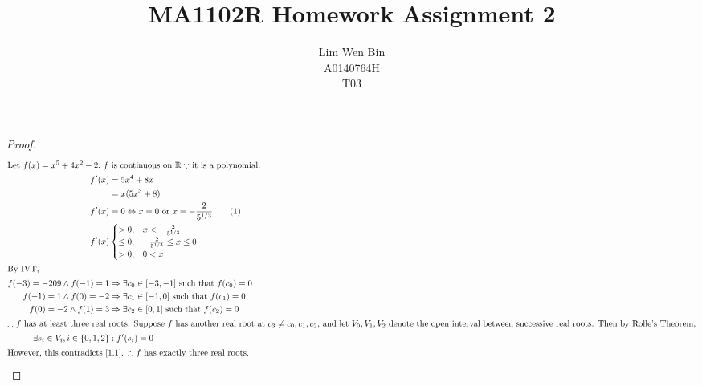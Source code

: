 \documentclass[12pt]{article}
\newenvironment{problem}[2][Problem]{\begin{trivlist}
\item[\hskip \labelsep {\bfseries #1}\hskip \labelsep {\bfseries #2.}]}{\end{trivlist}}
\begin{document}
\title{MA1102R Homework Assignment 2}
\author{Lim Wen Bin \\
A0140764H\\
T03}
\maketitle

\begin{problem}{1}
\end{problem}
\begin{proof}
\begin{align*}
\intertext{Let $f(x) = x^5 + 4x^2 - 2$, $f$ is continuous on $\mathbb{R} \because$ it is a polynomial.}
f'(x) &= 5x^4 + 8x\\
&= x(5x^3 + 8)\\
f'(x) &= 0 \Leftrightarrow x = 0 \text{ or } x = -\frac{2}{5^{1/3}} \tag{1}\label{1.1}\\
f'(x) &\begin{cases}
	> 0, & x < -\frac{2}{5^{1/3}}\\
	\le 0, & -\frac{2}{5^{1/3}} \le x \le 0\\
	> 0, & 0 < x
\end{cases}\\
\intertext{By IVT,}
f(-3) = -209 \land f(-1) = 1 &\Rightarrow \exists c_0 \in [-3,-1] \text{ such that } f(c_0) = 0\\
f(-1) = 1 \land f(0) = -2 &\Rightarrow \exists c_1 \in [-1,0] \text{ such that } f(c_1) = 0\\
f(0) = -2 \land f(1) = 3 &\Rightarrow \exists c_2 \in [0,1] \text{ such that } f(c_2) = 0\\
\intertext{$\therefore$ $f$ has at least three real roots. Suppose $f$ has another real root at $c_3 \ne c_0, c_1, c_2$, and let $V_0, V_1, V_2$ denote the open interval between successive real roots. Then by Rolle's Theorem,}
\exists s_i \in V_i, i \in \{0, 1, 2\} &: f'(s_i)= 0\\
\intertext{However, this contradicts \eqref{1.1}. $\therefore$ $f$ has exactly three real roots.}
\end{align*}
\end{proof}
\filbreak
\end{document}
